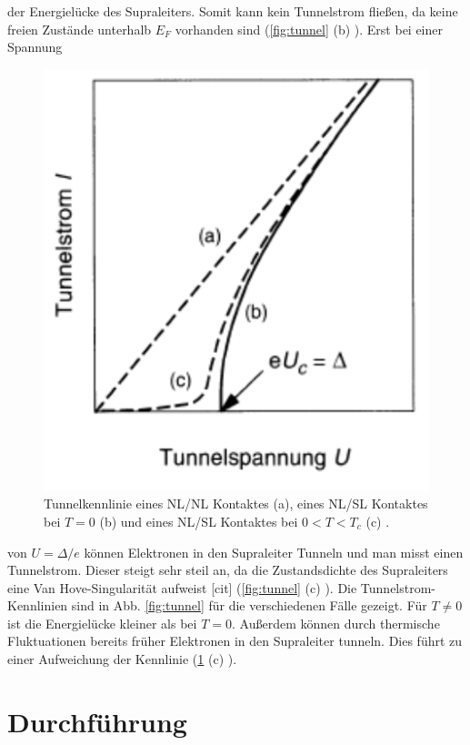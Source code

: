 \documentclass[twoside,        %
               BCOR12mm,       %
               english,ngerman, %
               fleqn,headsepline=false,footsepline=false
              ]{Vorlage/MFPREPORT}
\begin{document}
der Energielücke des Supraleiters. Somit kann kein Tunnelstrom fließen, da
keine freien Zustände unterhalb $E_F$ vorhanden sind (\ref{fig:tunnel} (b) ). Erst bei einer Spannung
\begin{figure}[]
    \begin{center}
        \includegraphics[scale=0.5]{fig/kennlinie.png}
    \end{center}
    \caption{Tunnelkennlinie eines NL/NL Kontaktes (a), eines NL/SL Kontaktes
    bei $T=0$ (b) und eines NL/SL Kontaktes bei $0<T<T_c$ (c) \cite[S:]{buckel2013supraleitung}.}
    \label{fig:kennlinie}
\end{figure}
von $U=\Delta/e$ können Elektronen in den Supraleiter Tunneln und man misst
einen Tunnelstrom. Dieser steigt sehr steil an, da die Zustandsdichte des
Supraleiters eine Van Hove-Singularität aufweist [cit] (\ref{fig:tunnel} (c) ).
Die Tunnelstrom- Kennlinien sind in Abb. \ref{fig:tunnel} für die verschiedenen
Fälle gezeigt. Für $T\neq 0$ ist die Energielücke kleiner als bei $T=0$.
Außerdem können durch thermische Fluktuationen bereits früher Elektronen in den
Supraleiter tunneln. Dies führt zu einer Aufweichung der Kennlinie
(\ref{fig:kennlinie} (c) ).


\section{Durchführung}
\label{sec:durchfuehrung}
\end{document}
